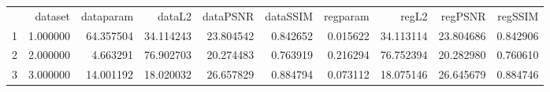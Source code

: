 \begin{tabular}{lrrrrrrrrr}
 & dataset & dataparam & dataL2 & dataPSNR & dataSSIM & regparam & regL2 & regPSNR & regSSIM \\
1 & 1.000000 & 64.357504 & 34.114243 & 23.804542 & 0.842652 & 0.015622 & 34.113114 & 23.804686 & 0.842906 \\
2 & 2.000000 & 4.663291 & 76.902703 & 20.274483 & 0.763919 & 0.216294 & 76.752394 & 20.282980 & 0.760610 \\
3 & 3.000000 & 14.001192 & 18.020032 & 26.657829 & 0.884794 & 0.073112 & 18.075146 & 26.645679 & 0.884746 \\
\end{tabular}

